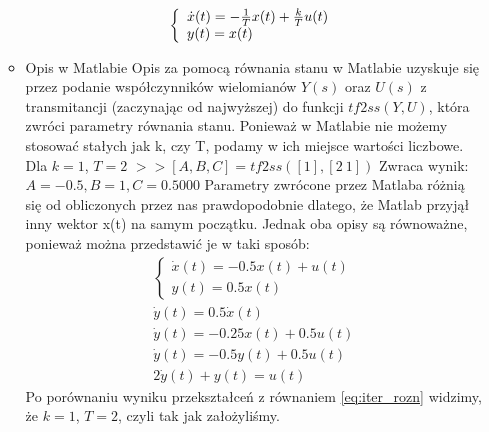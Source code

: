 \documentclass[a4paper,10pt]{article}
\begin{document}
\begin{itemize}
\begin{itemize}
\begin{eqnarray}
		\left\{ \begin{array}{l}
			\dot{x}(t) = -{1 \over T}x(t) + {k \over T}u(t)\\
			y(t) = x(t)
		\end{array} \right.
	\end{eqnarray}
\item Opis w Matlabie
\newline Opis za pomocą równania stanu w Matlabie uzyskuje się przez podanie współczynników wielomianów $Y(s)$ oraz $U(s)$ z transmitancji (zaczynając od najwyższej) do funkcji $tf2ss(Y, U)$, która zwróci parametry równania stanu.
Ponieważ w Matlabie nie możemy stosować stałych jak k, czy T, podamy w ich miejsce wartości liczbowe.
\newline\newline Dla $k=1$, $T=2$
\newline $>>[A,B,C] = tf2ss([1], [2 \ 1])$
\newline Zwraca wynik:
$A = -0.5, B = 1, C = 0.5000$
\newline \newline Parametry zwrócone przez Matlaba różnią się od obliczonych przez nas prawdopodobnie dlatego, że Matlab przyjął inny wektor x(t) na samym początku. Jednak oba opisy są równoważne, ponieważ można przedstawić je w taki sposób:
		\begin{eqnarray}
		\nonumber \left\{ \begin{array}{l}
			\dot{x}(t) = -0.5x(t) + u(t)\\
			y(t) = 0.5x(t)
		\end{array} \right.\\
		\nonumber \dot{y}(t) = 0.5\dot{x}(t)\\
		\nonumber \dot{y}(t) = -0.25x(t) + 0.5u(t)\\
		\nonumber \dot{y}(t) = -0.5y(t) + 0.5u(t)\\
		2\dot{y}(t) + y(t) = u(t)
	\end{eqnarray}
Po porównaniu wyniku przekształceń z równaniem \ref{eq:iter_rozn} widzimy, że $k=1$, $T=2$, czyli tak jak założyliśmy.

\end{itemize}


\end{itemize}
\end{document}
